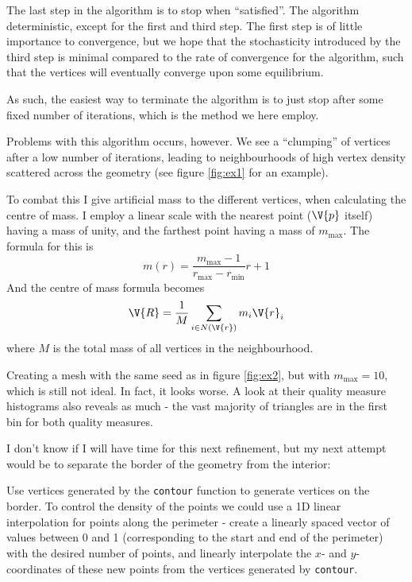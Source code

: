 \documentclass[sigconf]{acmart}
\begin{document}
The last step in the algorithm is to stop when  ``satisfied''. The algorithm deterministic, except for the first and third step. The first step is of little importance to convergence, but we hope that the stochasticity introduced by the third step is minimal compared to the rate of convergence for the algorithm, such that the vertices will eventually converge upon some equilibrium.

As such, the easiest way to terminate the algorithm is to just stop after some fixed number of iterations, which is the method we here employ.

Problems with this algorithm occurs, however. We see a ``clumping'' of vertices after a low number of iterations, leading to neighbourhoods of high vertex density scattered across the geometry (see figure \ref{fig:ex1} for an example).

To combat this I give artificial mass to the different vertices, when calculating the centre of mass. I employ a linear scale with the nearest point ($ \V{p} $ itself) having a mass of unity, and the farthest point having a mass of $ m_{\max} $. The formula for this is
\begin{equation}\label{key}
	m(r) = \frac{m_{\max} - 1}{r_{\max} - r_{\min}} r + 1
\end{equation}
And the centre of mass formula becomes
\begin{equation}\label{key}
	\V{R} = \frac{1}{M} \sum_{i \in N(\V{r})} m_i \V{r}_i
\end{equation}
where $ M $ is the total mass of all vertices in the neighbourhood.

Creating a mesh with the same seed as in figure \ref{fig:ex2}, but with $ m_{\max} = 10 $, which is still not ideal. In fact, it looks worse. A look at their quality measure histograms also reveals as much - the vast majority of triangles are in the first bin for both quality measures.

I don't know if I will have time for this next refinement, but my next attempt would be to separate the border of the geometry from the interior:

Use vertices generated by the \texttt{contour} function to generate vertices on the border. To control the density of the points we could use a 1D linear interpolation for points along the perimeter - create a linearly spaced vector of values between 0 and 1 (corresponding to the start and end of the perimeter) with the desired number of points, and linearly interpolate the $ x $- and $ y $-coordinates of these new points from the vertices generated by \texttt{contour}.
\end{document}

